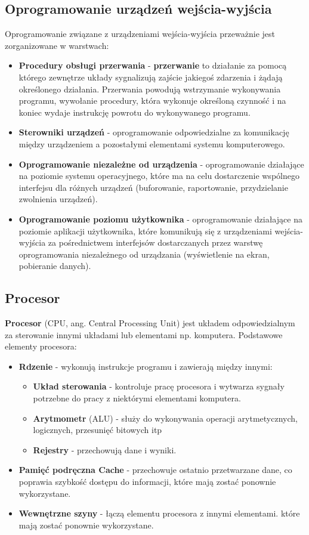 \documentclass{article}
\begin{document}
\subsection{Oprogramowanie urządzeń wejścia-wyjścia}
Oprogramowanie związane z urządzeniami wejścia-wyjścia przeważnie jest zorganizowane w warstwach:
\begin{itemize}
    \item \textbf{Procedury obsługi przerwania} - \textbf{przerwanie} to działanie za pomocą którego zewnętrze układy sygnalizują zajście jakiegoś zdarzenia i żądają określonego działania. Przerwania powodują wstrzymanie wykonywania programu, wywołanie procedury, która wykonuje określoną czynność i na koniec wydaje instrukcję powrotu do wykonywanego programu.
    \item \textbf{Sterowniki urządzeń} - oprogramowanie odpowiedzialne za komunikację między urządzeniem a pozostałymi elementami systemu komputerowego.
    \item \textbf{Oprogramowanie niezależne od urządzenia} - oprogramowanie działające na poziomie systemu operacyjnego, które ma na celu dostarczenie wspólnego interfejsu dla różnych urządzeń (buforowanie, raportowanie, przydzielanie zwolnienia urządzeń).
    \item \textbf{Oprogramowanie poziomu użytkownika} - oprogramowanie działające na poziomie aplikacji użytkownika, które komunikują się z urządzeniami wejścia-wyjścia za pośrednictwem interfejsów dostarczanych przez warstwę oprogramowania niezależnego od urządzania (wyświetlenie na ekran, pobieranie danych).
\end{itemize}

\subsection{Procesor}
\textbf{Procesor} (CPU, ang. Central Processing Unit) jest układem odpowiedzialnym za sterowanie innymi układami lub elementami np. komputera.
Podstawowe elementy procesora:
\begin{itemize}
    \item \textbf{Rdzenie} - wykonują instrukcje programu i zawierają między innymi:
    \begin{itemize}
        \item \textbf{Układ sterowania} - kontroluje pracę procesora i wytwarza sygnały potrzebne do pracy z niektórymi elementami komputera. 
        \item \textbf{Arytmometr} (ALU) - służy do wykonywania operacji arytmetycznych, logicznych, przesunięć bitowych itp
        \item \textbf{Rejestry} - przechowują dane i wyniki.
    \end{itemize}
    \item \textbf{Pamięć podręczna Cache} - przechowuje ostatnio przetwarzane dane, co poprawia szybkość dostępu do informacji, które mają zostać ponownie wykorzystane.
    \item \textbf{Wewnętrzne szyny} - łączą elementu procesora z innymi elementami. które mają zostać ponownie wykorzystane.
\end{itemize}
\end{document}

